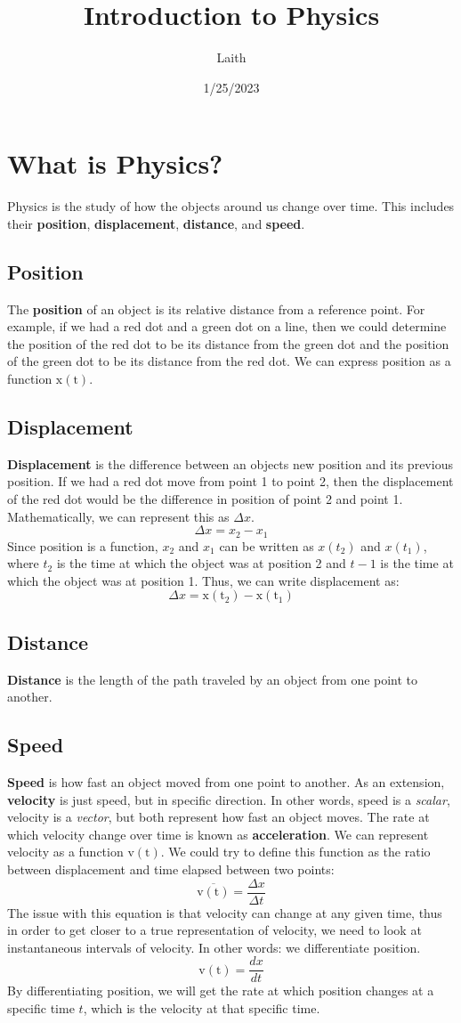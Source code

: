 \documentclass{article}
\author{Laith}
\title{Introduction to Physics}
\date{1/25/2023}
\newcommand{\diff}[1]{\frac{#1}{dt}}
\begin{document}
	\maketitle
	\section{What is Physics?}
	Physics is the study of how the objects around us change over time. 
	This includes their \textbf{position}, \textbf{displacement}, \textbf{distance}, and \textbf{speed}.
	\subsection{Position}
	The \textbf{position} of an object is its relative distance from a reference point. For example, if we had a red dot and a green dot on a line, then we could
	determine the position of the red dot to be its distance from the green dot and the position of the green dot to be its distance from the red dot.
	We can express position as a function $\mathrm{x(t)}$.
	\subsection{Displacement}
	\textbf{Displacement} is the difference between an objects new position and its previous position. If we had a red dot move from point 1 to point 2, then the
	displacement of the red dot would be the difference in position of point 2 and point 1.
	Mathematically, we can represent this as $\Delta{x}$.
	\[\Delta{x} = x_2-x_1\]
	Since position is a function, $x_2$ and $x_1$ can be written as $x(t_2)$ and $x(t_1)$, where $t_2$ is the time at which
	the object was at position 2 and $t-1$ is the time at which the object was at position 1. Thus, we can write 
	displacement as:
	\[\Delta{x} = \mathrm{x(t_2)}-\mathrm{x(t_1)}\]  
	\subsection{Distance}
	\textbf{Distance} is the length of the path traveled by an object from one point to another.
	\subsection{Speed}
	\textbf{Speed} is how fast an object moved from one point to another. As an extension, \textbf{velocity} is just speed, but in specific direction. In other words,
	speed is a \emph{scalar}, velocity is a \emph{vector}, but both represent how fast an object moves. The rate at which velocity change over time is known as \textbf{acceleration}.
	We can represent velocity as a function $\mathrm{v(t)}$. We could try to define this function as the ratio between displacement and time elapsed between two points:
	\[\overline{\mathrm{v(t)}} = \frac{\Delta{x}}{\Delta{t}}\]
	The issue with this equation is that velocity can change at any given time, thus in order to get closer to a true representation
	of velocity, we need to look at instantaneous intervals of velocity. In other words: we differentiate position.
	\[\mathrm{v(t)} = \diff{dx}\]
	By differentiating position, we will get the rate at which position changes at a specific time $t$, which is the velocity at that specific time.
\end{document}

